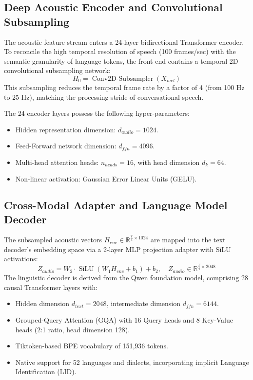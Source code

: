 \documentclass[conference]{IEEEtran}
\begin{document}
\subsection{Deep Acoustic Encoder and Convolutional Subsampling}
The acoustic feature stream enters a 24-layer bidirectional Transformer encoder. To reconcile the high temporal resolution of speech (100 frames/sec) with the semantic granularity of language tokens, the front end contains a temporal 2D convolutional subsampling network:
\begin{equation}
H_0 = \operatorname{Conv2D-Subsampler}(X_{mel})
\end{equation}
This subsampling reduces the temporal frame rate by a factor of 4 (from 100 Hz to 25 Hz), matching the processing stride of conversational speech.

The 24 encoder layers possess the following hyper-parameters:
\begin{itemize}
    \item Hidden representation dimension: $d_{audio} = 1024$.
    \item Feed-Forward network dimension: $d_{ffn} = 4096$.
    \item Multi-head attention heads: $n_{heads} = 16$, with head dimension $d_k = 64$.
    \item Non-linear activation: Gaussian Error Linear Units (GELU).
\end{itemize}

\subsection{Cross-Modal Adapter and Language Model Decoder}
The subsampled acoustic vectors $H_{enc} \in \mathbb{R}^{\frac{T}{4} \times 1024}$ are mapped into the text decoder's embedding space via a 2-layer MLP projection adapter with SiLU activations:
\begin{equation}
Z_{audio} = W_2 \cdot \operatorname{SiLU}(W_1 H_{enc} + b_1) + b_2, \quad Z_{audio} \in \mathbb{R}^{\frac{T}{4} \times 2048}
\end{equation}
The linguistic decoder is derived from the Qwen foundation model, comprising 28 causal Transformer layers with:
\begin{itemize}
    \item Hidden dimension $d_{text} = 2048$, intermediate dimension $d_{ffn} = 6144$.
    \item Grouped-Query Attention (GQA) with 16 Query heads and 8 Key-Value heads (2:1 ratio, head dimension 128).
    \item Tiktoken-based BPE vocabulary of 151,936 tokens.
    \item Native support for 52 languages and dialects, incorporating implicit Language Identification (LID).
\end{itemize}
\end{document}
